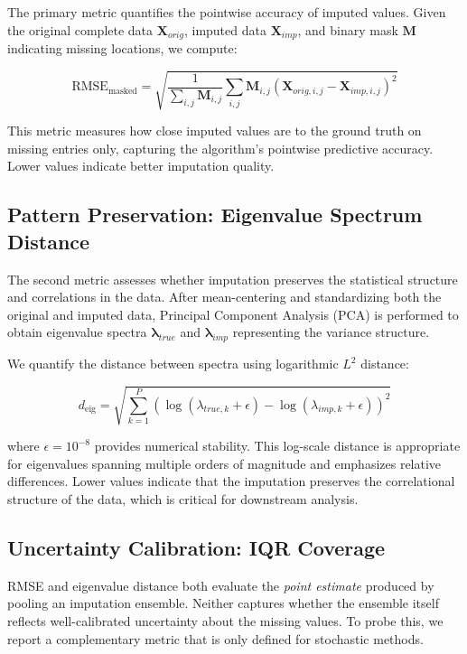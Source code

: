 \documentclass[preprint]{aastex631}
\begin{document}
The primary metric quantifies the pointwise accuracy of imputed values. Given the original complete data $\mathbf{X}_{orig}$, imputed data $\mathbf{X}_{imp}$, and binary mask $\mathbf{M}$ indicating missing locations, we compute:

\begin{equation}
  \text{RMSE}_{\text{masked}} = \sqrt{\frac{1}{\sum_{i,j} \mathbf{M}_{i,j}} \sum_{i,j} \mathbf{M}_{i,j} (\mathbf{X}_{orig,i,j} - \mathbf{X}_{imp,i,j})^2}
\end{equation}

This metric measures how close imputed values are to the ground truth on missing entries only, capturing the algorithm's pointwise predictive accuracy. Lower values indicate better imputation quality.

\subsection{Pattern Preservation: Eigenvalue Spectrum Distance}

The second metric assesses whether imputation preserves the statistical structure and correlations in the data. After mean-centering and standardizing both the original and imputed data, Principal Component Analysis (PCA) is performed to obtain eigenvalue spectra $\mathbf{\lambda}_{true}$ and $\mathbf{\lambda}_{imp}$ representing the variance structure.

We quantify the distance between spectra using logarithmic $L^2$ distance:

\begin{equation}
  d_{\text{eig}} = \sqrt{\sum_{k=1}^{P} (\log(\lambda_{true,k} + \epsilon) - \log(\lambda_{imp,k} + \epsilon))^2}
\end{equation}

where $\epsilon = 10^{-8}$ provides numerical stability. This log-scale distance is appropriate for eigenvalues spanning multiple orders of magnitude and emphasizes relative differences. Lower values indicate that the imputation preserves the correlational structure of the data, which is critical for downstream analysis.

\subsection{Uncertainty Calibration: IQR Coverage}

RMSE and eigenvalue distance both evaluate the \emph{point estimate} produced by pooling an imputation ensemble. Neither captures whether the ensemble itself reflects well-calibrated uncertainty about the missing values. To probe this, we report a complementary metric that is only defined for stochastic methods.
\end{document}
